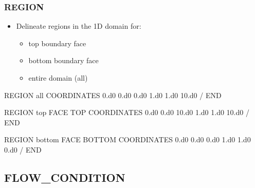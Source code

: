\documentclass{beamer}
\begin{document}
\begin{frame}\frametitle{REGION}

\begin{itemize}
  \item Delineate regions in the 1D domain for:
  \begin{itemize}
    \item top boundary face
    \item bottom boundary face
    \item entire domain (all)
  \end{itemize}
\end{itemize}

\begin{semiverbatim}
REGION all
  COORDINATES
    0.d0 0.d0 0.d0
    1.d0 1.d0 10.d0
  /
END

\newpage
REGION top
  FACE TOP
  COORDINATES
    0.d0 0.d0 10.d0
    1.d0 1.d0 10.d0
  /
END

REGION bottom
  FACE BOTTOM
  COORDINATES
    0.d0 0.d0 0.d0
    1.d0 1.d0 0.d0
  /
END
\end{semiverbatim}

\end{frame}

\subsection{FLOW\_CONDITION}
\end{document}

